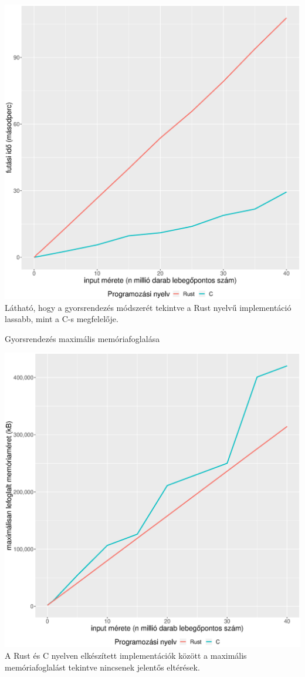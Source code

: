 \includegraphics[width=15.5cm]{kepek/quicksort_run.eps}
Látható, hogy a gyorsrendezés módszerét tekintve a Rust nyelvű implementáció lassabb, mint a C-s megfelelője.

\noindent Gyorsrendezés maximális memóriafoglalása

\includegraphics[width=15.5cm]{kepek/quicksort_memory.eps}
A Rust és C nyelven elkészített implementációk között a maximális memóriafoglalást tekintve nincsenek jelentős eltérések.

